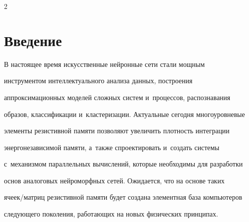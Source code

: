      




 


\vspace*{-6pt}













\thispagestyle{headings}





\begin{multicols}{2}





\label{st\stat}


     


\section{Введение}





    В настоящее время искусственные нейронные сети стали мощным 


инструментом интеллектуального анализа данных, построения 


аппрок\-си\-ма\-ционных моделей сложных систем и~процессов, распознавания 


образов, классификации и~кластеризации. Актуальные сегодня многоуровневые 


элементы резистивной памяти позволяют увеличить плотность интеграции 


энергонезависимой памяти, а~также спроектировать и~создать системы 


с~механизмом параллельных вычислений, которые необходимы для разработки 


основ аналоговых нейроморфных сетей. Ожидается, что на основе таких 


яче\-ек/мат\-риц резистивной памяти будет создана элементная база компьютеров 


следующего поколения, работающих на новых физических прин\-ципах.


{





}
\end{multicols}
